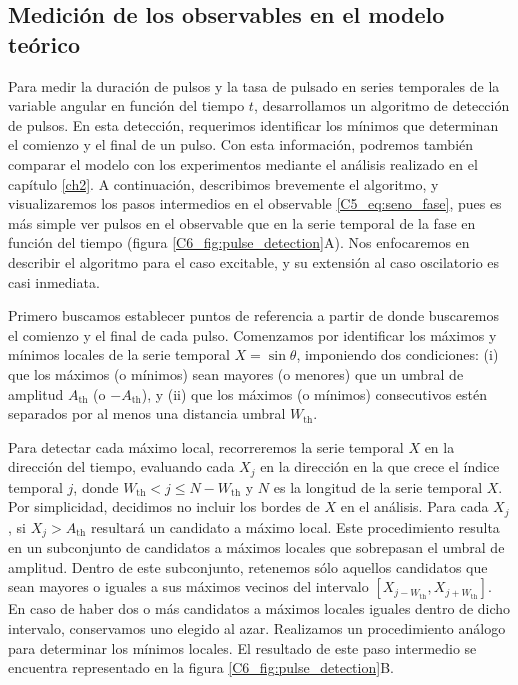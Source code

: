 \documentclass[./main.tex]{subfiles}
\begin{document}
\subsection{Medición de los observables en el modelo teórico}
\label{C6_ssec:deteccion_de_pulsos}

Para medir la duración de pulsos y la tasa de pulsado en series temporales de la variable angular \xx en función del tiempo $t$, desarrollamos un algoritmo de detección de pulsos. En esta detección, requerimos identificar los mínimos que determinan el comienzo y el final de un pulso. Con esta información, podremos también comparar el modelo con los experimentos mediante el análisis realizado en el capítulo \ref{ch2}. A continuación, describimos brevemente el algoritmo, y visualizaremos los pasos intermedios en el observable \ref{C5_eq:seno_fase}, pues es más simple ver pulsos en el observable que en la serie temporal de la fase en función del tiempo (figura \ref{C6_fig:pulse_detection}A). Nos enfocaremos en describir el algoritmo para el caso excitable, y su extensión al caso oscilatorio es casi inmediata.


Primero buscamos establecer puntos de referencia a partir de donde buscaremos el comienzo y el final de cada pulso. Comenzamos por identificar los máximos y mínimos locales de la serie temporal $X = \sin{\theta}$, imponiendo dos condiciones: (i) que los máximos (o mínimos) sean mayores (o menores) que un umbral de amplitud $A_{\text{th}}$ (o $-A_{\text{th}}$), y (ii) que los máximos (o mínimos) consecutivos estén separados por al menos una distancia umbral $W_{\text{th}}$. 


Para detectar cada máximo local, recorreremos la serie temporal $X$ en la dirección del tiempo, evaluando cada $X_j$ en la dirección en la que crece el índice temporal $j$, donde $W_{\text{th}} < j \leq N - W_{\text{th}}$ y $N$ es la longitud de la serie temporal $X$. Por simplicidad, decidimos no incluir los bordes de $X$ en el análisis. Para cada $X_j$, si $X_j > A_{\text{th}}$ resultará un candidato a máximo local. Este procedimiento resulta en un subconjunto de candidatos a máximos locales que sobrepasan el umbral de amplitud. Dentro de este subconjunto, retenemos sólo aquellos candidatos que sean mayores o iguales a sus máximos vecinos del intervalo $\left[ X_{j-W_{\text{th}}},X_{j+W_{\text{th}}}\right]$. En caso de haber dos o más candidatos a máximos locales iguales dentro de dicho intervalo, conservamos uno elegido al azar. Realizamos un procedimiento análogo para determinar los mínimos locales. El resultado de este paso intermedio se encuentra representado en la figura \ref{C6_fig:pulse_detection}B.
 
\end{document}

